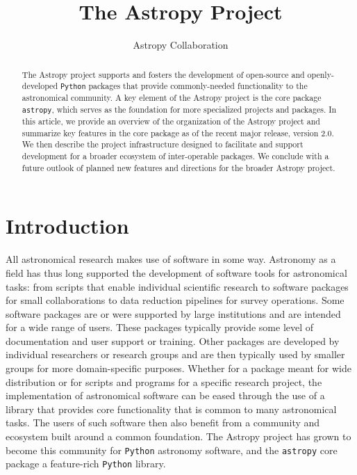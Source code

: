 \documentclass[modern]{aastex61}
\newcommand{\package}[1]{\texttt{#1}\xspace}
\newcommand{\python}{\package{Python}}
\newcommand{\astropy}{Astropy\xspace}
\newcommand{\astropypkg}{\package{astropy}}
\begin{document}
\draft{\today}

\title{The Astropy Project}


\author{Astropy Collaboration}

\begin{abstract}
The \astropy project supports and fosters the development of open-source and openly-developed
\python packages that provide commonly-needed functionality to the astronomical
community.
A key element of the \astropy project is the core package \astropypkg, which serves as the
foundation for more specialized projects and packages.
In this article, we provide an overview of the organization of the \astropy
project and summarize key features in the core package as of the recent major
release, version 2.0.
We then describe the project infrastructure designed to facilitate and support
development for a broader ecosystem of inter-operable packages.
We conclude with a future outlook of planned new features and directions for the
broader \astropy project.
\end{abstract}



\section{Introduction} \label{sec:intro}
All astronomical research makes use of software in some way.  Astronomy as a field has thus long supported the development of software tools
for astronomical tasks: from scripts that enable individual scientific research to software packages for small collaborations to data reduction pipelines for survey operations.
Some software packages are or were supported by large institutions and are intended for a wide range of users. These packages typically provide some level of documentation and user support or
training.
Other packages are developed by individual researchers or research groups and
are then typically used by smaller groups for more domain-specific purposes.
Whether for a package meant for wide distribution or for scripts and programs
for a specific research project, the implementation of astronomical software can
be eased through the use of a library that provides core functionality that is
common to many astronomical tasks.
The users of such software then also benefit from a community and ecosystem
built around a common foundation.
The \astropy project has grown to become this community for \python astronomy
software, and the \astropypkg core package a feature-rich \python library.
\end{document}
